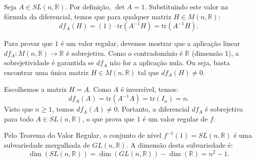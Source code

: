 {	Seja $A \in SL(n, \mathbb{R})$. Por definição, $\det A = 1$. Substituindo este valor na fórmula da diferencial, temos que para qualquer matriz $H \in M(n, \mathbb{R})$:
	\begin{equation*}
		df_A(H) = (1) \cdot \text{tr}(A^{-1}H) = \text{tr}(A^{-1}H).
	\end{equation*}
	
	Para provar que $1$ é um valor regular, devemos mostrar que a aplicação linear $df_A : M(n, \mathbb{R}) \to \mathbb{R}$ é sobrejetiva. Como o contradomínio é $\mathbb{R}$ (dimensão 1), a sobrejetividade é garantida se $df_A$ não for a aplicação nula. Ou seja, basta encontrar uma única matriz $H \in M(n, \mathbb{R})$ tal que $df_A(H) \neq 0$.
	
	Escolhemos a matriz $H = A$. Como $A$ é inversível, temos:
	\begin{equation*}
		df_A(A) = \text{tr}(A^{-1}A) = \text{tr}(I_n) = n.
	\end{equation*}
	Visto que $n \geq 1$, temos $df_A(A) \neq 0$. Portanto, a diferencial $df_A$ é sobrejetiva para todo $A \in SL(n, \mathbb{R})$, o que prova que $1$ é um valor regular de $f$.
	
	Pelo Teorema do Valor Regular, o conjunto de nível $f^{-1}(1) = SL(n, \mathbb{R})$ é uma subvariedade mergulhada de $GL(n, \mathbb{R})$. A dimensão desta subvariedade é:
	\begin{equation*}
		\dim(SL(n, \mathbb{R})) = \dim(GL(n, \mathbb{R})) - \dim(\mathbb{R}) = n^2 - 1.
	\end{equation*}
}


